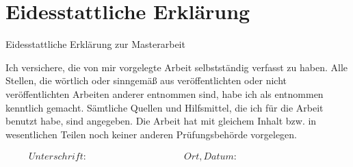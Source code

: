 
\section*{Eidesstattliche Erklärung}
\thispagestyle{empty}

\vspace{1cm}

\begin{LARGE}Eidesstattliche Erklärung zur Masterarbeit\end{LARGE}

\vspace{1cm}

Ich versichere, die von mir vorgelegte Arbeit selbstständig verfasst zu haben.
Alle Stellen, die wörtlich oder sinngemäß aus veröffentlichten oder nicht veröffentlichten Arbeiten anderer entnommen sind,
habe ich als entnommen kenntlich gemacht. Sämtliche Quellen und Hilfsmittel,
die ich für die Arbeit benutzt habe, sind angegeben.
Die Arbeit hat mit gleichem Inhalt bzw. in wesentlichen Teilen noch keiner anderen Prüfungsbehörde vorgelegen.



\begin{displaymath}
    \begin{array}{ll}
        Unterschrift:~~~~~~~~~~~~~~~~~~~~~~~~~~~~~~~~~~~~~~~~~~
        & Ort, Datum:~~~~~~~~~~~~~~~~~~~~~~~~~~~~~~~~~~~~~~~~~~
    \end{array}
\end{displaymath}